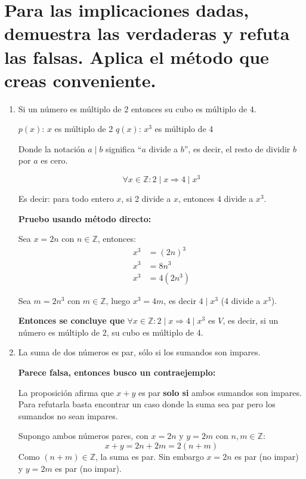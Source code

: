 \documentclass[12pt]{article}
\begin{document}

\section[Demostración y refutación de implicaciones]{Para las implicaciones dadas, demuestra las verdaderas y refuta las falsas. Aplica el método que creas conveniente.}

\begin{enumerate}[label=\alph*.-]
    
    \item Si un número es múltiplo de 2 entonces su cubo es múltiplo de 4.

    $p(x)$: $x$ es múltiplo de 2 \quad $q(x)$: $x^3$ es múltiplo de 4

    Donde la notación $a \mid b$ significa ``$a$ divide a $b$'', es decir, el resto de dividir $b$ por $a$ es cero.

    \[\forall x \in \mathbb{Z}: 2 \mid x \Rightarrow 4 \mid x^3\]

    Es decir: para todo entero $x$, si 2 divide a $x$, entonces 4 divide a $x^3$.

    \textbf{Pruebo usando método directo:}

    Sea $x = 2n$ con $n \in \mathbb{Z}$, entonces:
    \begin{align*}
        x^3 &= (2n)^3 \\
        x^3 &= 8n^3 \\
        x^3 &= 4(2n^3)
    \end{align*}

    Sea $m = 2n^3$ con $m \in \mathbb{Z}$, luego $x^3 = 4m$, es decir $4 \mid x^3$ (4 divide a $x^3$).

    \textbf{Entonces se concluye que} $\forall x \in \mathbb{Z}: 2 \mid x \Rightarrow 4 \mid x^3$ es $V$, es decir, si un número es múltiplo de 2, su cubo es múltiplo de 4.

    \item La suma de dos números es par, sólo si los sumandos son impares.

    \textbf{Parece falsa, entonces busco un contraejemplo:}

    La proposición afirma que $x + y$ es par \textbf{solo si} ambos sumandos son impares. Para refutarla basta encontrar un caso donde la suma sea par pero los sumandos no sean impares.

    Supongo ambos números pares, con $x = 2n$ y $y = 2m$ con $n, m \in \mathbb{Z}$:
    \[x + y = 2n + 2m = 2(n+m)\]
    Como $(n+m) \in \mathbb{Z}$, la suma es par. Sin embargo $x = 2n$ es par (no impar) y $y = 2m$ es par (no impar).


\end{enumerate}
\end{document}
